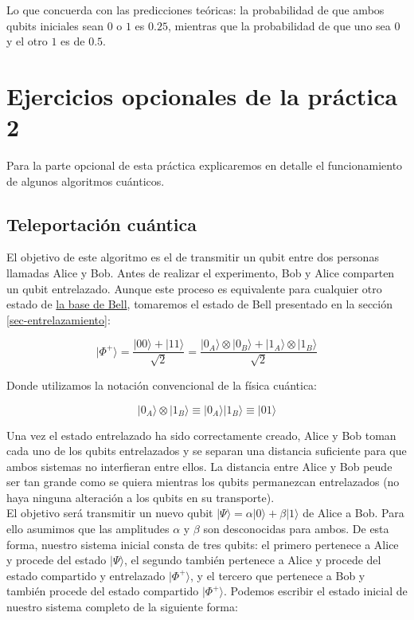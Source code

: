 \documentclass[11pt]{article}
\newcommand{\ra}{\rangle}
\theoremstyle{plain}
\begin{document}
Lo que concuerda con las predicciones teóricas: la probabilidad de que ambos qubits iniciales sean $0$ o $1$ es $0.25$, mientras que la probabilidad de que uno sea $0$ y el otro $1$ es de $0.5$.


\section{Ejercicios opcionales de la práctica 2}

Para la parte opcional de esta práctica explicaremos en detalle el funcionamiento de algunos algoritmos cuánticos.


\subsection{Teleportación cuántica}


El objetivo de este algoritmo es el de transmitir un qubit entre dos personas llamadas Alice y Bob. Antes de realizar el experimento, Bob y Alice comparten un qubit entrelazado. Aunque este proceso es equivalente para cualquier otro estado de \href{https://es.wikipedia.org/wiki/Base_de_Bell}{la base de Bell}, tomaremos el estado de Bell presentado en la sección \ref{sec-entrelazamiento}:

\[
	|\Phi^+\ra = \frac{|00\ra + |11\ra}{\sqrt 2} = \frac{|0_A\ra \otimes |0_B\ra + |1_A\ra \otimes |1_B\ra}{\sqrt 2}
\]

Donde utilizamos la notación convencional de la física cuántica:

\[
	|0_A\ra \otimes |1_B\ra \equiv |0_A\ra|1_B\ra  \equiv |01\ra 
\]

Una vez el estado entrelazado ha sido correctamente creado, Alice y Bob toman cada uno de los qubits entrelazados y se separan una distancia suficiente para que ambos sistemas no interfieran entre ellos. La distancia entre Alice y Bob peude ser tan grande como se quiera mientras los qubits permanezcan entrelazados (no haya ninguna alteración a los qubits en su transporte). \\

El objetivo será transmitir un nuevo qubit $|\Psi\ra = \alpha|0\ra + \beta|1\ra$ de Alice a Bob. Para ello asumimos que las amplitudes $\alpha$ y $\beta$ son desconocidas para ambos. De esta forma, nuestro sistema inicial consta de tres qubits: el primero pertenece a Alice y procede del estado $|\Psi\ra$, el segundo también pertenece a Alice y procede del estado compartido y entrelazado $|\Phi^+\ra$, y el tercero que pertenece a Bob y también procede del estado compartido $|\Phi^+\ra$. Podemos escribir el estado inicial de nuestro sistema completo de la siguiente forma:
\end{document}
